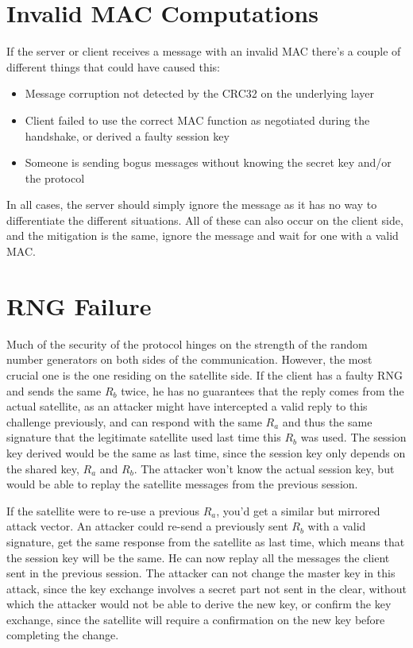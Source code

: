 \section{Invalid MAC Computations}\label{sec:invalid-mac}

If the server or client receives a message with an invalid MAC there's a couple of different things that could have caused this:

\begin{itemize}
    \item Message corruption not detected by the CRC32 on the underlying layer
    \item Client failed to use the correct MAC function as negotiated during the handshake, or derived a faulty session key
    \item Someone is sending bogus messages without knowing the secret key and/or the protocol
\end{itemize}

In all cases, the server should simply ignore the message as it has no way to differentiate the different situations. All of these can also occur on the client side, and the mitigation is the same, ignore the message and wait for one with a valid MAC.


\section{RNG Failure}\label{sec:rng-failure}

Much of the security of the protocol hinges on the strength of the random number generators on both sides of the communication. However, the most crucial one is the one residing on the satellite side. If the client has a faulty RNG and sends the same \( R_b \) twice, he has no guarantees that the reply comes from the actual satellite, as an attacker might have intercepted a valid reply to this challenge previously, and can respond with the same \( R_a \) and thus the same signature that the legitimate satellite used last time this \( R_b \) was used. The session key derived would be the same as last time, since the session key only depends on the shared key, \( R_a \) and \( R_b \). The attacker won't know the actual session key, but would be able to replay the satellite messages from the previous session.

If the satellite were to re-use a previous \( R_a \), you'd get a similar but mirrored attack vector. An attacker could re-send a previously sent \( R_b \) with a valid signature, get the same response from the satellite as last time, which means that the session key will be the same. He can now replay all the messages the client sent in the previous session. The attacker can not change the master key in this attack, since the key exchange involves a secret part not sent in the clear, without which the attacker would not be able to derive the new key, or confirm the key exchange, since the satellite will require a confirmation on the new key before completing the change.


